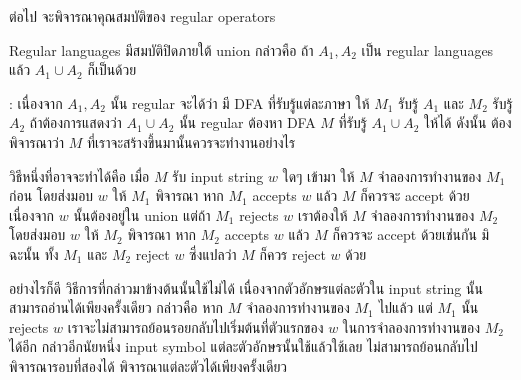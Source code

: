 ต่อไป จะพิจารณาคุณสมบัติของ regular operators
\begin{theorem}\label{thm:dfa-union-closed}
Regular languages มีสมบัติปิดภายใต้ union กล่าวคือ ถ้า $A_1,A_2$ เป็น regular languages แล้ว $A_1\cup A_2$ ก็เป็นด้วย

:
เนื่องจาก $A_1,A_2$ นั้น regular จะได้ว่า มี DFA ที่รับรู้แต่ละภาษา \enskip ให้ $M_1$ รับรู้ $A_1$ และ $M_2$ รับรู้ $A_2$ \enskip ถ้าต้องการแสดงว่า $A_1\cup A_2$ นั้น regular ต้องหา DFA $M$ ที่รับรู้ $A_1\cup A_2$ ให้ได้ \enskip ดังนั้น ต้องพิจารณาว่า $M$ ที่เราจะสร้างขึ้นมานั้นควรจะทำงานอย่างไร

วิธีหนึ่งที่อาจจะทำได้คือ เมื่อ $M$ รับ input string $w$ ใดๆ เข้ามา ให้ $M$ จำลองการทำงานของ $M_1$ ก่อน โดยส่งมอบ $w$ ให้ $M_1$ พิจารณา \enskip หาก $M_1$ accepts $w$ แล้ว $M$ ก็ควรจะ accept ด้วย เนื่องจาก $w$ นั้นต้องอยู่ใน union \enskip แต่ถ้า $M_1$ rejects $w$ เราต้องให้ $M$ จำลองการทำงานของ $M_2$ โดยส่งมอบ $w$ ให้ $M_2$ พิจารณา \enskip หาก $M_2$ accepts $w$ แล้ว $M$ ก็ควรจะ accept ด้วยเช่นกัน มิฉะนั้น ทั้ง $M_1$ และ $M_2$ reject $w$ ซึ่งแปลว่า $M$ ก็ควร reject $w$ ด้วย

อย่างไรก็ดี วิธีการที่กล่าวมาข้างต้นนั้นใช้ไม่ได้ เนื่องจากตัวอักษรแต่ละตัวใน input string นั้นสามารถอ่านได้เพียงครั้งเดียว กล่าวคือ หาก $M$ จำลองการทำงานของ $M_1$ ไปแล้ว แต่ $M_1$ นั้น rejects $w$ เราจะไม่สามารถย้อนรอยกลับไปเริ่มต้นที่ตัวแรกของ $w$ ในการจำลองการทำงานของ $M_2$ ได้อีก \enskip กล่าวอีกนัยหนึ่ง input symbol แต่ละตัวอักษรนั้นใช้แล้วใช้เลย ไม่สามารถย้อนกลับไปพิจารณารอบที่สองได้ พิจารณาแต่ละตัวได้เพียงครั้งเดียว


\end{theorem}
